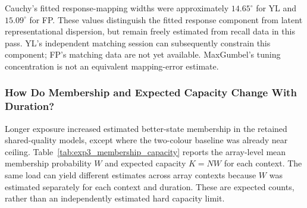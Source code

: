 Cauchy's fitted response-mapping widths were approximately $14.65^\circ$ for YL and $15.09^\circ$ for FP. These values distinguish the fitted response component from latent representational dispersion, but remain freely estimated from recall data in this pass. YL's independent matching session can subsequently constrain this component; FP's matching data are not yet available. MaxGumbel's tuning concentration is not an equivalent mapping-error estimate.

\subsubsection{How Do Membership and Expected Capacity Change With Duration?}

Longer exposure increased estimated better-state membership in the retained shared-quality models, except where the two-colour baseline was already near ceiling. Table~\ref{tab:exp3_membership_capacity} reports the array-level mean membership probability $W$ and expected capacity $K=NW$ for each context. The same load can yield different estimates across array contexts because $W$ was estimated separately for each context and duration. These are expected counts, rather than an independently estimated hard capacity limit.

